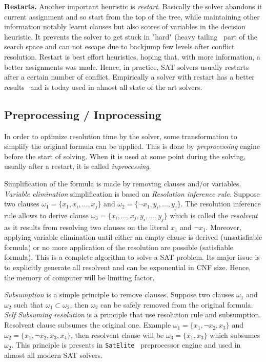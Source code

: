 \textbf{Restarts.}
Another important heuristic is \emph{restart}. Basically the solver abandons it current assignment and so 
start from the top of the tree, while maintaining other information notably learnt clauses but also scores of variables in the decision heuristic. It prevents the solver to get stuck in "hard" (heavy tailing~\cite{gomes1997heavy} part of the search space and can not escape due to backjump few levels after conflict resolution. Restart is best effort heuristics, hoping that,
with more information, a better assignments was made. Hence, in practice, SAT solvers usually restarts after a
certain number of conflict. Empirically a solver with restart has a better results~\cite{huang2007effect} and is today
used in almost all state of the art solvers.


\subsection{Preprocessing / Inprocessing}

In order to optimize resolution time by the solver, some transformation to simplify the original formula can be applied. This is done by \emph{preprocessing} engine before the start of solving. When it is used at some point during the solving, usually after a restart, it is called \emph{inprocessing}.

Simplification of the formula is made by removing clauses and/or variables.\\
\emph{Variable elimination} simplification is based on \emph{Resolution inference rule}.
Suppose two clauses	$\omega_1 = \{x_1, x_i, ..., x_j \}$ and $\omega_2 = \{\neg x_1, y_i, ..., y_j\}$.
The resolution inference rule allows to derive clause $\omega_3 = \{x_i, ..., x_j, y_i, ..., y_j\}$ which is called
the \emph{resolvent} as it results from resolving two clauses on the literal $x_1$ and $\neg x_1$.
Moreover,  applying variable elimination until either an empty clause is derived (unsatisfiable formula) or no more application of the resolution are possible (satisfiable formula). This is a complete algorithm to solve a SAT problem.
Its major issue is to explicitly generate all resolvent and can be exponential in CNF size.
Hence, the memory of computer will be limiting factor.


\emph{Subsumption} is a simple principle to remove clauses. Suppose two clauses $\omega_1$ and $\omega_2$ such that
$\omega_1 \subset  \omega_2$, then $\omega_2$ can be safely removed from the original formula.
\emph{Self Subsuming resolution} is a principle that use resolution rule and subsumption.
Resolvent clause subsumes the original one. Example $\omega_1 = \{x_1, \neg x_2, x_3\}$ and $\omega_2 = \{x_1, \neg x_2, x_3, x_4\}$, then resolvent clause will be $\omega_3 = \{x_1, x_3\}$ which subsumes $\omega_2$. This principle
is presents in \texttt{SatElite}~\cite{een2005effective} preprocessor engine and used in almost all modern SAT solvers.


